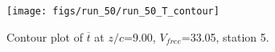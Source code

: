 \begin{figure}[H]
\centering
\texttt{[image: figs/run\_50/run\_50\_T\_contour]}
\caption{Contour plot of $\overline{t}$ at $z/c$=9.00, $V_{free}$=33.05, station 5.}
\label{fig:run_50_T_contour}
\end{figure}


